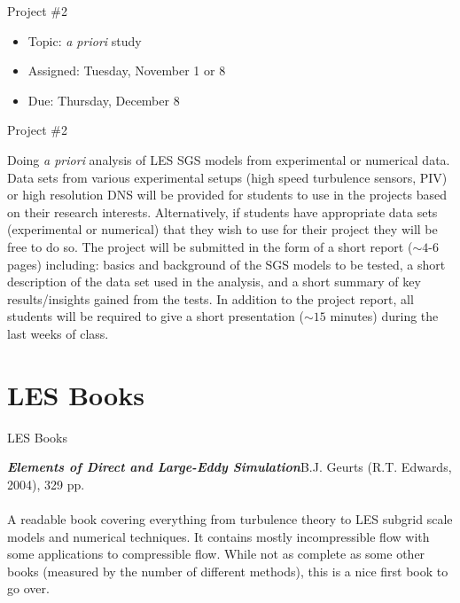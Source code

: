 
\begin{frame}{Project \#2}

\begin{itemize}
\item Topic:\tabto*{50pt} \textit{a priori} study
\item Assigned:\tabto*{50pt} Tuesday, November 1 or 8
\item Due:\tabto*{50pt} Thursday, December 8
\end{itemize}

\end{frame}


\begin{frame}{Project \#2}

Doing \textit{a priori} analysis of LES SGS models from experimental or numerical data.  Data sets from various experimental setups (high speed turbulence sensors, PIV) or high resolution DNS will be provided for students to use in the projects based on their research interests.  Alternatively, if students have appropriate data sets (experimental or numerical) that they wish to use for their project they will be free to do so. The project will be submitted in the form of a short report  ($\sim4$-$6$ pages) including: basics and background of the SGS models to be tested, a short description of the data set used in the analysis, and a short summary of key results/insights gained from the tests.  In addition to the project report, all students will be required to give a short presentation ($\sim15$ minutes) during the last weeks of class. 
\end{frame}

\section{LES Books}
\begin{frame}{LES Books}

\emph{\textbf{Elements of Direct and Large-Eddy Simulation}}\newline B.J. Geurts (R.T. Edwards, 2004), 329 pp.
~\\~\\
A readable book covering everything from turbulence theory to LES subgrid scale models and numerical techniques. It contains mostly incompressible flow with some applications to compressible flow. While not as complete as some other books (measured by the number of different methods), this is a nice first book to go over.	
\end{frame}

